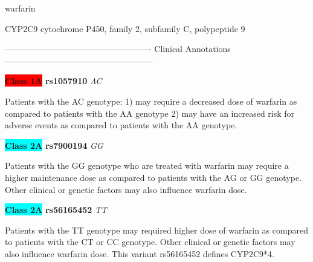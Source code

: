 \documentclass{resume} %
\begin{document}
\begin{rSection}{ warfarin }
\begin{rSubsection}{ CYP2C9 }{ cytochrome P450, family 2, subfamily C, polypeptide 9 }{}{}
\item[] ---------------------------------------------------- Clinical Annotations -----------------------------------------------------\newline
\item \textbf{\colorbox{red} {Class 1A}} \textbf{ rs1057910 } \textit{ AC }
\item[] Patients with the AC genotype: 1) may require a decreased dose of warfarin as compared to patients with the AA genotype 2) may have an increased risk for adverse events as compared to patients with the AA genotype.\item \textbf{\colorbox{cyan} {Class 2A}} \textbf{ rs7900194 } \textit{ GG }
\item[] Patients with the GG genotype who are treated with warfarin may require a higher maintenance dose as compared to patients with the AG or GG genotype.  Other clinical or genetic factors may also influence warfarin dose.\item \textbf{\colorbox{cyan} {Class 2A}} \textbf{ rs56165452 } \textit{ TT }
\item[] Patients with the TT genotype may required higher dose of warfarin as compared to patients with the CT or CC genotype. Other clinical or genetic factors may also influence  warfarin dose. This variant rs56165452 defines CYP2C9*4.

\end{rSubsection}


\end{rSection}
\end{document}
